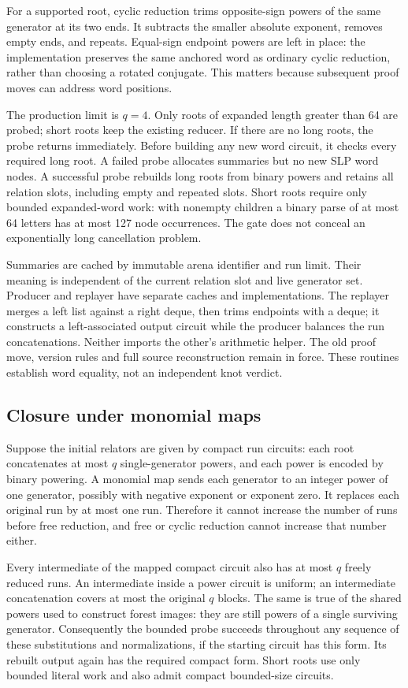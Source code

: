 For a supported root, cyclic reduction trims opposite-sign powers of the
same generator at its two ends. It subtracts the smaller absolute exponent,
removes empty ends, and repeats. Equal-sign endpoint powers are left in
place: the implementation preserves the same anchored word as ordinary
cyclic reduction, rather than choosing a rotated conjugate. This matters
because subsequent proof moves can address word positions.

The production limit is $q=4$. Only roots of expanded length greater than
64 are probed; short roots keep the existing reducer. If there are no long
roots, the probe returns immediately. Before building any new word circuit,
it checks every required long root. A failed probe allocates summaries but
no new SLP word nodes. A successful probe rebuilds long roots from binary
powers and retains all relation slots, including empty and repeated slots.
Short roots require only bounded expanded-word work: with nonempty children
a binary parse of at most 64 letters has at most 127 node occurrences.
The gate does not conceal an exponentially long cancellation problem.

Summaries are cached by immutable arena identifier and run limit. Their
meaning is independent of the current relation slot and live generator set.
Producer and replayer have separate caches and implementations. The replayer
merges a left list against a right deque, then trims endpoints with a deque;
it constructs a left-associated output circuit while the producer balances
the run concatenations. Neither imports the other's arithmetic helper.
The old proof move, version rules and full source reconstruction remain in
force. These routines establish word equality, not an independent knot verdict.

\subsection{Closure under monomial maps}

Suppose the initial relators are given by compact run circuits: each root
concatenates at most $q$ single-generator powers, and each power is encoded
by binary powering. A monomial map sends each generator to an integer power
of one generator, possibly with negative exponent or exponent zero.
It replaces each original run by at most one run. Therefore it cannot
increase the number of runs before free reduction, and free or cyclic
reduction cannot increase that number either.

Every intermediate of the mapped compact circuit also has at most $q$
freely reduced runs. An intermediate inside a power circuit is uniform;
an intermediate concatenation covers at most the original $q$ blocks.
The same is true of the shared powers used to construct forest images:
they are still powers of a single surviving generator. Consequently the
bounded probe succeeds throughout any sequence of these substitutions and
normalizations, if the starting circuit has this form. Its rebuilt output
again has the required compact form. Short roots use only bounded literal
work and also admit compact bounded-size circuits.

